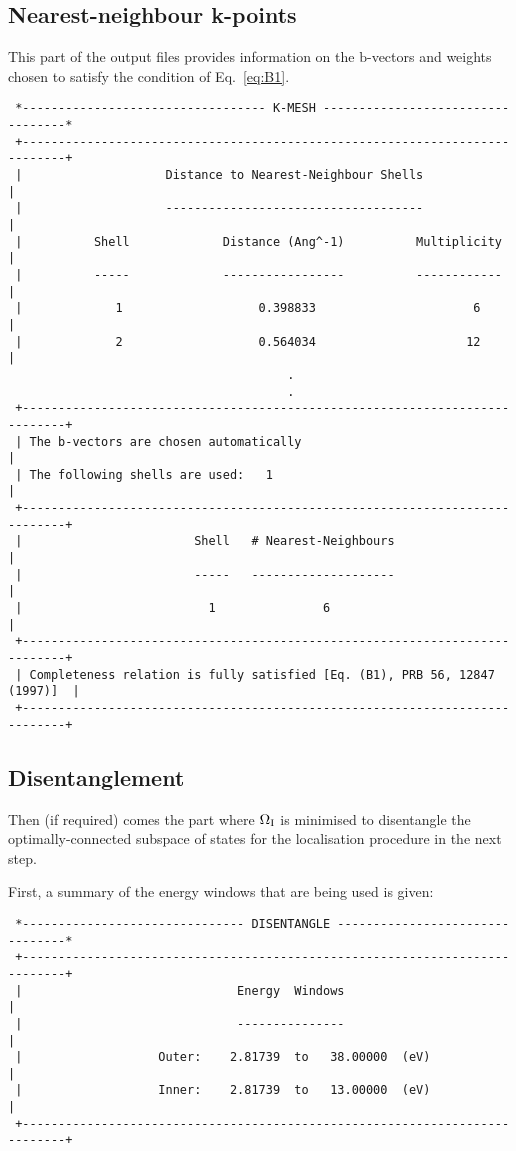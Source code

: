 \subsection{Nearest-neighbour k-points}

This part of the output files provides information on the
$\mathrm{b}$-vectors and weights chosen to satisfy the condition of
Eq.~\ref{eq:B1}. 

\begin{verbatim}
 *---------------------------------- K-MESH ----------------------------------*
 +----------------------------------------------------------------------------+
 |                    Distance to Nearest-Neighbour Shells                    |
 |                    ------------------------------------                    |
 |          Shell             Distance (Ang^-1)          Multiplicity         |
 |          -----             -----------------          ------------         |
 |             1                   0.398833                      6            |
 |             2                   0.564034                     12            |
                                       .
                                       .
 +----------------------------------------------------------------------------+
 | The b-vectors are chosen automatically                                     |
 | The following shells are used:   1                                         |
 +----------------------------------------------------------------------------+
 |                        Shell   # Nearest-Neighbours                        |
 |                        -----   --------------------                        |
 |                          1               6                                 |
 +----------------------------------------------------------------------------+
 | Completeness relation is fully satisfied [Eq. (B1), PRB 56, 12847 (1997)]  |
 +----------------------------------------------------------------------------+
\end{verbatim}

\subsection{Disentanglement}

Then (if required) comes the part where $\Omega_{\mathrm{I}}$ is minimised to
disentangle the optimally-connected subspace of states for the
localisation procedure in the next step.

First, a summary of the energy windows that are being used is given:
\begin{verbatim}
 *------------------------------- DISENTANGLE --------------------------------*
 +----------------------------------------------------------------------------+
 |                              Energy  Windows                               |
 |                              ---------------                               |
 |                   Outer:    2.81739  to   38.00000  (eV)                   |
 |                   Inner:    2.81739  to   13.00000  (eV)                   |
 +----------------------------------------------------------------------------+
\end{verbatim}

